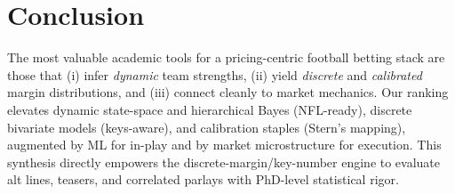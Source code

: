 \documentclass[11pt]{amsart}
\begin{document}
\section*{Conclusion}
The most valuable academic tools for a pricing-centric football betting stack are those that (i) infer \emph{dynamic} team strengths, (ii) yield \emph{discrete} and \emph{calibrated} margin distributions, and (iii) connect cleanly to market mechanics. Our ranking elevates dynamic state-space and hierarchical Bayes (NFL-ready), discrete bivariate models (keys-aware), and calibration staples (Stern’s mapping), augmented by ML for in-play and by market microstructure for execution. This synthesis directly empowers the discrete-margin/key-number engine to evaluate alt lines, teasers, and correlated parlays with PhD-level statistical rigor.

\bigskip
\end{document}
